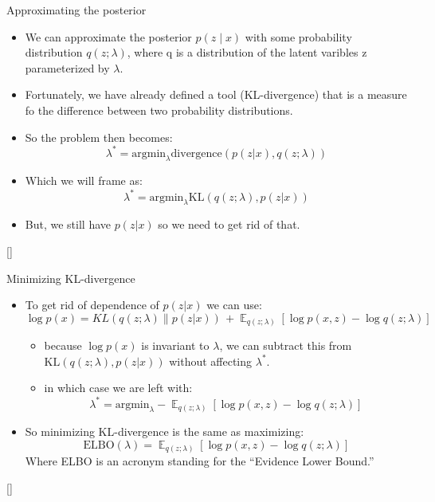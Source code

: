 \documentclass{beamer}
\begin{document}
\begin{frame}{Approximating the posterior}
  \begin{itemize}
  \item We can approximate the posterior $p(z \mid x)$ with some probability distribution $q(z ; \lambda)$, where q is a distribution of the latent varibles z parameterized by $\lambda$.
  \item Fortunately, we have already defined a tool (KL-divergence) that is a measure fo the difference between two probability distributions.
  \item So the problem then becomes:
    \[\lambda^* = \text{argmin}_\lambda \text{divergence}(p(z|x), q(z; \lambda))\]
  \item Which we will frame as:
    \[\lambda^* = \text{argmin}_\lambda \text{KL}(q(z; \lambda), p(z|x))\] %
  \item But, we still have $p(z|x)$ so we need to get rid of that.
  \end{itemize}
  [\cite{tran2016}]
\end{frame}

\begin{frame}{Minimizing KL-divergence}
  \begin{itemize}
  \item To get rid of dependence of $p(z|x)$ we can use:
    \[\log p(x) = KL(q(z; \lambda) \| p(z | x)) \, + \mathop{\mathbb{E}}_{q(z ; \lambda)} \left[\log p(x, z) - \log q(z ; \lambda) \right]\] %
    \begin{itemize}
    \item because $\log p(x)$ is invariant to $\lambda$, we can subtract this from $\text{KL}(q(z; \lambda), p(z|x))$ without affecting $\lambda^*$.
    \item in which case we are left with:
      \[\lambda^* = \text{argmin}_\lambda - \mathop{\mathbb{E}}_{q(z ; \lambda)} \left[\log p(x, z) - \log q(z ; \lambda) \right]\]
    \end{itemize}
  \item So minimizing KL-divergence is the same as maximizing:
    \[\text{ELBO}(\lambda) = \mathop{\mathbb{E}}_{q(z ; \lambda)} \left[\log p(x, z) - \log q(z ; \lambda) \right]\]
    Where ELBO is an acronym standing for the ``Evidence Lower Bound.''
        
  \end{itemize}
  [\cite{tran2016}]
\end{frame}
\end{document}
